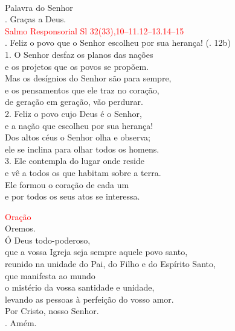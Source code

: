 \documentclass{book}
\begin{document}
\begin{flushleft}
    \vspace{0.1cm} \\
    Palavra do Senhor \\
    {\color{red} \Rbar.} Graças a Deus.
    \vspace{0.2cm} \\
    \textcolor{red}{Salmo Responsorial
        \hspace{\fill} Sl 32(33),10--11.12--13.14--15}
    \vspace{0.1cm} \\
    {\color{red} \Rbar.} Feliz o povo que o Senhor escolheu por sua herança!
    \hspace{\fill}
    {\color{red} (\Rbar. 12b)}
    \vspace{0.1cm} \\
    1. O Senhor desfaz os planos das nações \\
    e os projetos que os povos se propõem. \\
    Mas os desígnios do Senhor são para sempre, \\
    e os pensamentos que ele traz no coração, \\
    de geração em geração, vão perdurar.
    \vspace{0.1cm} \\
    2. Feliz o povo cujo Deus é o Senhor, \\
    e a nação que escolheu por sua herança! \\
    Dos altos céus o Senhor olha e observa; \\
    ele se inclina para olhar todos os homens.
    \vspace{0.1cm} \\
    3. Ele contempla do lugar onde reside \\
    e vê a todos os que habitam sobre a terra. \\
    Ele formou o coração de cada um \\
    e por todos os seus atos se interessa.

    \newpage

    \textcolor{red}{Oração}
    \vspace{0.1cm} \\
    Oremos.
    \vspace{0.1cm}\\
    Ó Deus todo-poderoso, \\
    que a vossa Igreja seja sempre aquele povo santo, \\
    reunido na unidade do Pai, do Filho e do Espírito Santo, \\
    que manifesta ao mundo \\
    o mistério da vossa santidade e unidade, \\
    levando as pessoas à perfeição do vosso amor. \\
    Por Cristo, nosso Senhor. \\
    {\color{red} \Rbar.} Amém.
    \vspace{0.2cm} \\


\end{flushleft}
\end{document}
